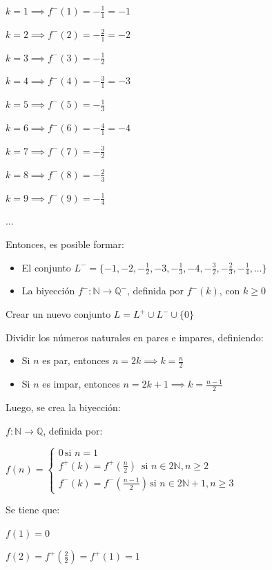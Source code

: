 \documentclass{article}
\begin{document}
$k = 1 \implies f^-(1) = -\frac{1}{1} = -1$

$k = 2 \implies f^-(2) = -\frac{2}{1} = -2$

$k = 3 \implies f^-(3) = -\frac{1}{2}$

$k = 4 \implies f^-(4) = -\frac{3}{1} = -3$

$k = 5 \implies f^-(5) = -\frac{1}{3}$

$k = 6 \implies f^-(6) = -\frac{4}{1} = -4$

$k = 7 \implies f^-(7) = -\frac{3}{2}$

$k = 8 \implies f^-(8) = -\frac{2}{3}$

$k = 9 \implies f^-(9) = -\frac{1}{4}$

$\dots$

Entonces, es posible formar:

\begin{itemize}
    \item El conjunto $L^- = \{-1, -2, -\frac{1}{2}, -3, -\frac{1}{3}, -4, -\frac{3}{2}, -\frac{2}{3}, -\frac{1}{4}, \dots\}$
    \item La biyección $f^- : \mathbb{N} \to \mathbb{Q^-}$, definida por $f^-(k)$, con $k \ge 0$
\end{itemize}

Crear un nuevo conjunto $L = L^+ \cup L^- \cup \{0\}$

Dividir los números naturales en pares e impares, definiendo:

\begin{itemize}
    \item Si $n$ es par, entonces $n = 2k \implies k = \frac{n}{2}$
    \item Si $n$ es impar, entonces $n = 2k + 1 \implies k = \frac{n - 1}{2}$
\end{itemize}

Luego, se crea la biyección:

$f: \mathbb{N} \to \mathbb{Q}$, definida por:

$
f(n) = 
\begin{cases}
    0 \, \text{si } n = 1 \\
    f^+(k) = f^+(\frac{n}{2}) \, \text{ si } n \in 2 \mathbb{N}, n \ge 2 \\
    f^-(k) = f^-(\frac{n - 1}{2}) \, \text{si } n \in 2 \mathbb{N} + 1, n \ge 3
\end{cases}
$

Se tiene que:

$f(1) = 0$

$f(2) = f^+(\frac{2}{2}) = f^+(1) = 1$
\end{document}
